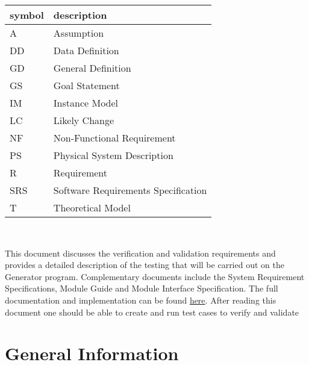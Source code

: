 \documentclass[12pt, titlepage]{article}
\begin{document}
\renewcommand{\arraystretch}{1.2}
\begin{tabular}{l l} 
  \toprule		
  \textbf{symbol} & \textbf{description}\\
  \midrule 
  A & Assumption\\
  DD & Data Definition\\
  GD & General Definition\\
  GS & Goal Statement\\
  IM & Instance Model\\
  LC & Likely Change\\
  NF & Non-Functional Requirement\\
  PS & Physical System Description\\
  R & Requirement\\
  SRS & Software Requirements Specification\\
  T & Theoretical Model\\
  \bottomrule
\end{tabular}\\


\newpage

\tableofcontents

\listoftables


\newpage


This document discusses the verification and validation requirements and
provides a detailed description of the testing that will be carried out on the
\progname {} Generator program.
Complementary documents include the System Requirement Specifications, Module
Guide and Module Interface Specification.  The full documentation and
implementation can be found
\href{https://www.github.com/karolserkis}{here}. After reading this document one
should be able to create and run test cases to verify and validate \progname


\section{General Information}
\end{document}

